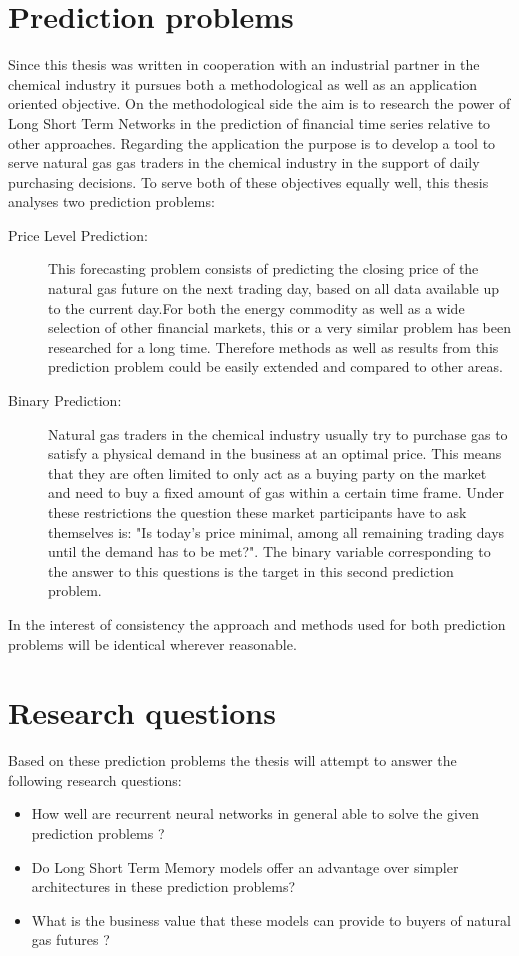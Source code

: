 \section{Prediction problems}
Since this thesis was written in cooperation with an industrial partner in the chemical industry it pursues both a methodological as well as an application oriented objective. On the methodological side the aim is to research the power of Long Short Term Networks in the prediction of financial time series relative to other approaches. Regarding the application the purpose is to develop a tool to serve natural gas gas traders in the chemical industry in the support of daily purchasing decisions. To serve both of these objectives equally well, this thesis analyses two prediction problems:
\begin{description}
\item[Price Level Prediction:] This forecasting problem consists of predicting the closing price of the natural gas future on the next trading day, based on all data available up to the current day.For both the energy commodity as well as a wide selection of other financial markets, this or a very similar problem has been researched for a long time. Therefore methods as well as results from this prediction problem could be easily extended and compared to other areas.
\item[Binary Prediction:] Natural gas traders in the chemical industry usually try to purchase gas to satisfy a physical demand in the business at an optimal price. This means that they are often limited to only act as a buying party on the market and need to buy a fixed amount of gas within a certain time frame. Under these restrictions the question these market participants have to ask themselves is: "Is today's price minimal, among all remaining trading days until the demand has to be met?". The binary variable corresponding to the answer to this questions is the target in this second prediction problem.
\end{description}
In the interest of consistency the approach and methods used for both prediction problems will be identical wherever reasonable.
\section{Research questions}
Based on these prediction problems the thesis will attempt to answer the following research questions:
\begin{itemize}
\item How well are recurrent neural networks in general able to solve the given prediction problems ?
\item Do Long Short Term Memory models offer an advantage over simpler architectures in these prediction problems?
\item What is the business value that these models can provide to buyers of natural gas futures ?
\end{itemize}
